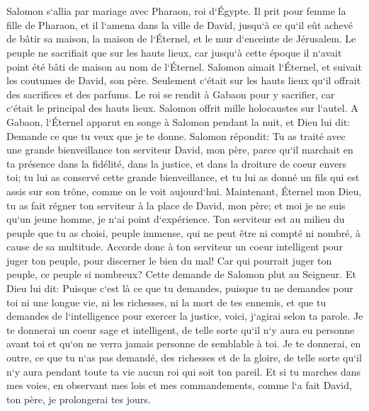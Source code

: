 \chapter{}

\verse Salomon s`allia par mariage avec Pharaon, roi d`Égypte. Il prit pour femme la fille de Pharaon, et il l`amena dans la ville de David, jusqu`à ce qu`il eût achevé de bâtir sa maison, la maison de l`Éternel, et le mur d`enceinte de Jérusalem. 
\verse Le peuple ne sacrifiait que sur les hauts lieux, car jusqu`à cette époque il n`avait point été bâti de maison au nom de l`Éternel. 
\verse Salomon aimait l`Éternel, et suivait les coutumes de David, son père. Seulement c`était sur les hauts lieux qu`il offrait des sacrifices et des parfums. 
\verse Le roi se rendit à Gabaon pour y sacrifier, car c`était le principal des hauts lieux. Salomon offrit mille holocaustes sur l`autel. 
\verse A Gabaon, l`Éternel apparut en songe à Salomon pendant la nuit, et Dieu lui dit: Demande ce que tu veux que je te donne. 
\verse Salomon répondit: Tu as traité avec une grande bienveillance ton serviteur David, mon père, parce qu`il marchait en ta présence dans la fidélité, dans la justice, et dans la droiture de coeur envers toi; tu lui as conservé cette grande bienveillance, et tu lui as donné un fils qui est assis sur son trône, comme on le voit aujourd`hui. 
\verse Maintenant, Éternel mon Dieu, tu as fait régner ton serviteur à la place de David, mon père; et moi je ne suis qu`un jeune homme, je n`ai point d`expérience. 
\verse Ton serviteur est au milieu du peuple que tu as choisi, peuple immense, qui ne peut être ni compté ni nombré, à cause de sa multitude. 
\verse Accorde donc à ton serviteur un coeur intelligent pour juger ton peuple, pour discerner le bien du mal! Car qui pourrait juger ton peuple, ce peuple si nombreux? 
\verse Cette demande de Salomon plut au Seigneur. 
\verse Et Dieu lui dit: Puisque c`est là ce que tu demandes, puisque tu ne demandes pour toi ni une longue vie, ni les richesses, ni la mort de tes ennemis, et que tu demandes de l`intelligence pour exercer la justice, 
\verse voici, j`agirai selon ta parole. Je te donnerai un coeur sage et intelligent, de telle sorte qu`il n`y aura eu personne avant toi et qu`on ne verra jamais personne de semblable à toi. 
\verse Je te donnerai, en outre, ce que tu n`as pas demandé, des richesses et de la gloire, de telle sorte qu`il n`y aura pendant toute ta vie aucun roi qui soit ton pareil. 
\verse Et si tu marches dans mes voies, en observant mes lois et mes commandements, comme l`a fait David, ton père, je prolongerai tes jours. 
